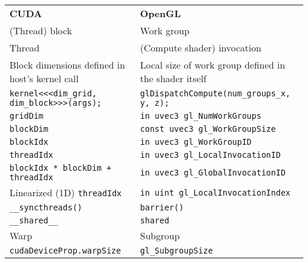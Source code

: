 \documentclass[8pt, table, xcdraw]{article}%
\begin{document}
\begin{table}[h!]
\begin{tabular}{ll}
\textbf{CUDA}                                        & \textbf{OpenGL}                                       \\
(Thread) block                                       & Work group                                            \\
Thread                                               & (Compute shader) invocation                           \\
Block dimensions defined in host's kernel call       & Local size of work group defined in the shader itself \\
\lstinline[]$kernel<<<dim_grid, dim_block>>>(args);$ & \lstinline[]$glDispatchCompute(num_groups_x, y, z);$  \\
\lstinline[]$gridDim$                                & \lstinline[]$in uvec3 gl_NumWorkGroups$               \\
\lstinline[]$blockDim$                               & \lstinline[]$const uvec3 gl_WorkGroupSize$            \\
\lstinline[]$blockIdx$                               & \lstinline[]$in uvec3 gl_WorkGroupID$                 \\
\lstinline[]$threadIdx$                              & \lstinline[]$in uvec3 gl_LocalInvocationID$           \\
\lstinline[]$blockIdx * blockDim + threadIdx$        & \lstinline[]$in uvec3 gl_GlobalInvocationID$          \\
Linearized (1D) \lstinline[]$threadIdx$              & \lstinline[]$in uint gl_LocalInvocationIndex$         \\
\lstinline[]$__syncthreads()$                        & \lstinline[]$barrier()$                               \\
\lstinline[]$__shared__$                             & \lstinline[]$shared$                                  \\
Warp                                                 & Subgroup                                              \\
\lstinline[]$cudaDeviceProp.warpSize$                & \lstinline[]$gl_SubgroupSize$                                              
\end{tabular}
\end{table}
\end{document}
